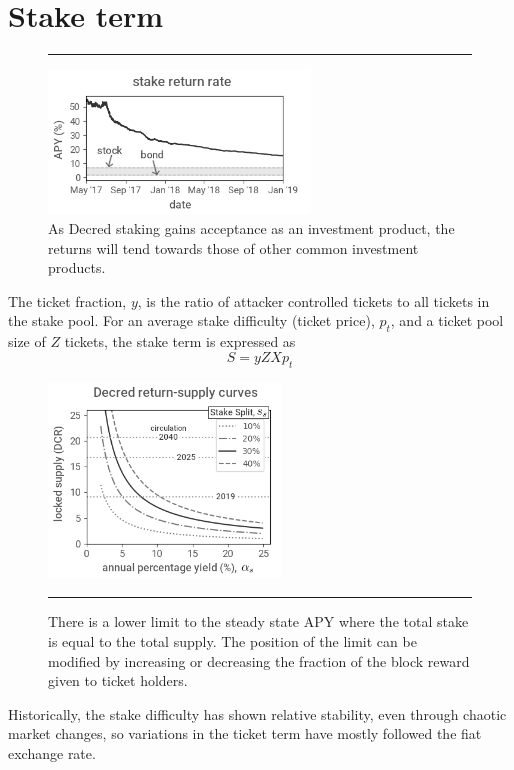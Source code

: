 \documentclass[a4paper,12pt]{article}
\begin{document}
\section{Stake term}
%
\begin{figure}[!b]
\hrule
	\vspace{5pt}
	\begin{center}
	\includegraphics[width=0.62\textwidth]{stakereturn}
\begin{minipage}[t]{0.85\textwidth}
	\caption{As Decred staking gains acceptance as an investment product, the returns will tend towards those of other common investment products. }
	\end{minipage}
  	\end{center}
\end{figure}
%
The ticket fraction, $y$, is the ratio of attacker controlled tickets to all tickets in the stake pool. For an average stake difficulty (ticket price), $ p_t $, and a ticket pool size of $ Z $ tickets, the stake term is expressed as 
%
\begin{equation}
S = yZXp_t
\end{equation}
%
%
\begin{figure}[h]
	\begin{center}
	\includegraphics[width=0.55\textwidth]{returnsupply}
\begin{minipage}[t]{0.85\textwidth}
	\caption{There is a lower limit to the steady state APY where the total stake is equal to the total supply. The position of the limit can be modified by increasing or decreasing the fraction of the block reward given to ticket holders. }
	\end{minipage}
  	\end{center}
	\hrule
\end{figure}
%
Historically, the stake difficulty has shown relative stability, even through chaotic market changes, so variations in the ticket term have mostly followed the fiat exchange rate. 
\end{document}
